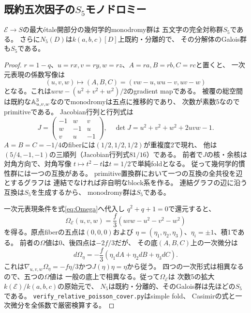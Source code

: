 \subsection{既約五次因子の\texorpdfstring{$S_5$}{S5}モノドロミー}
\begin{theorem}[一次元表現被覆の完全対称群]
\label{thm:character-cover-S5}
$\mathcal E\to S$の最大\'{e}tale開部分の幾何学的monodromy群は
五文字の完全対称群$S_5$である。
さらに$N_5(D)$は$k(a,b,c)[D]$上既約・分離的で、
その分解体のGalois群も$S_5$である。
\end{theorem}
\begin{proof}
$r=1-q$、$u=rx,v=ry,w=rz$、$A=ra,B=rb,C=rc$と置くと、
一次元表現の係数写像は
\begin{equation}\label{eq:five-character-gradient}
 (u,v,w)\mapsto(A,B,C)=(vw-u,wu-v,uv-w)
\end{equation}
となる。これは$uvw-(u^2+v^2+w^2)/2$のgradient mapである。
被覆の総空間は既約な$\AA^3_{u,v,w}$なのでmonodromyは五点に推移的であり、
次数が素数5なのでprimitiveである。
Jacobian行列と行列式は
\[
 J=\begin{pmatrix}-1&w&v\\w&-1&u\\v&u&-1\end{pmatrix},
 \quad\det J=u^2+v^2+w^2+2uvw-1.
\]
$A=B=C=-1/4$のfiberには$(1/2,1/2,1/2)$が重複度2で現れ、
他は$(5/4,-1,-1)$の三順列（Jacobian行列式$81/16$）である。
前者で$J$の核・余核は対角方向で、対角写像
$t\mapsto t^2-t$は$t=1/2$で単純foldとなる。
従って幾何学的慣性群には一つの互換がある。
primitive置換群において一つの互換の全共役を辺とするグラフは
連結でなければ非自明なblock系を作る。
連結グラフの辺に沿う互換は$S_5$を生成するから、
monodromy群は$S_5$である。

一次元表現条件を式\eqref{eq:Omega}へ代入し
$q^2+q+1=0$で還元すると、
\begin{equation}\label{eq:five-character-casimir}
 \Omega_{\mathcal E}(u,v,w)=\frac f3(uvw-u^2-v^2-w^2)
\end{equation}
を得る。原点fiberの五点は$(0,0,0)$および
$\eta=(\eta_1,\eta_2,\eta_3)$、$\eta_i=\pm1$、積1である。
前者の$\Omega$値は$0$、後四点は$-2f/3$だが、
その底$(A,B,C)$上の一次微分は
\[
 d\Omega_\eta=-\frac f3(\eta_1dA+\eta_2dB+\eta_3dC).
\]
これは$\nabla_{u,v,w}\Omega_\eta=-f\eta/3$かつ$J(\eta)\eta=\eta$から従う。
四つの一次形式は相異なるので、五つの$\Omega$値は
一般の底上で相異なる。従って$\Omega_{\mathcal E}$は
次数5の拡大$k(\mathcal E)/k(a,b,c)$の原始元で、
$N_5$は既約・分離的、そのGalois群は先ほどの$S_5$である。
\texttt{verify\_relative\_poisson\_cover.py}はsimple fold、
Casimirの式と一次微分を全係数で厳密検算する。
\end{proof}

